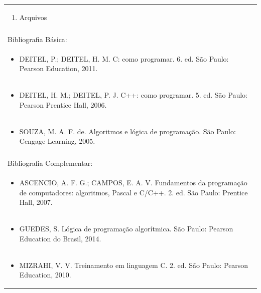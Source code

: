 \documentclass[11pt]{article}
\begin{document}
\begin{center}
\begin{longtable}{|p{4cm}|p{4cm}|p{4cm}|p{4cm}|}
\multicolumn{4}{|p{\dimexpr 16cm + 6\tabcolsep\relax}|}{\begin{enumerate}[start=16]\item Arquivos\end{enumerate}}\\
\multicolumn{4}{|p{\dimexpr 16cm + 6\tabcolsep\relax}|}{}\\
\hline
\multicolumn{4}{|p{16cm}|}{Bibliografia Básica:}\\*
\multicolumn{4}{|p{\dimexpr 16cm + 6\tabcolsep\relax}|}{\begin{itemize}\item DEITEL, P.; DEITEL, H. M. C: como programar. 6. ed. São Paulo: Pearson Education, 2011.\end{itemize}}\\
\multicolumn{4}{|p{\dimexpr 16cm + 6\tabcolsep\relax}|}{\begin{itemize}\item DEITEL, H. M.; DEITEL, P. J. C++: como programar. 5. ed. São Paulo: Pearson Prentice Hall, 2006.\end{itemize}}\\
\multicolumn{4}{|p{\dimexpr 16cm + 6\tabcolsep\relax}|}{\begin{itemize}\item SOUZA, M. A. F. de. Algoritmos e lógica de programação. São Paulo: Cengage Learning, 2005.\end{itemize}}\\
\multicolumn{4}{|p{16cm}|}{}\\
\hline
\multicolumn{4}{|p{16cm}|}{Bibliografia Complementar:}\\*
\multicolumn{4}{|p{\dimexpr 16cm + 6\tabcolsep\relax}|}{\begin{itemize}\item ASCENCIO, A. F. G.; CAMPOS, E. A. V. Fundamentos da programação de computadores: algoritmos, Pascal e C/C++. 2. ed. São Paulo: Prentice Hall, 2007.\end{itemize}}\\
\multicolumn{4}{|p{\dimexpr 16cm + 6\tabcolsep\relax}|}{\begin{itemize}\item GUEDES, S. Lógica de programação algorítmica. São Paulo: Pearson Education do Brasil, 2014.\end{itemize}}\\
\multicolumn{4}{|p{\dimexpr 16cm + 6\tabcolsep\relax}|}{\begin{itemize}\item MIZRAHI, V. V. Treinamento em linguagem C. 2. ed. São Paulo: Pearson Education, 2010.\end{itemize}}\\

\end{longtable}
\end{center}
\end{document}
